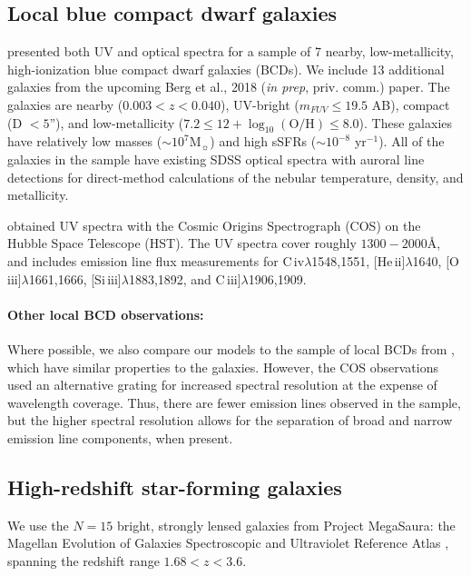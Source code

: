 \documentclass[preprint2]{aastex62}
\newcommand{\oiii}{[O\,{\sc iii}]\xspace}
\newcommand{\heii}{[He\,{\sc ii}]\xspace}
\newcommand{\civ}{C\,{\sc iv}\xspace}
\newcommand{\SiuIII}{[Si\,{\sc iii}]\xspace}
\newcommand{\ciii}{C\,{\sc iii}]\xspace}
\newcommand\Msun{\ensuremath{\mathrm{M_{\sun}}}\xspace}
\newcommand{\logten}{\ensuremath{\log_{10}}}
\newcommand{\logOH}{\ensuremath{\logten (\mathrm{O}/\mathrm{H})}\xspace}
\newcommand{\ang}{\ensuremath{\mbox{\AA}}\xspace}
\newcommand{\mage}{{\sc Meg}a{\sc S}a{\sc ura}\xspace}
\begin{document}
\subsection{Local blue compact dwarf galaxies}\label{sec:data:BCDs}

\citet{Berg+2016} presented both UV and optical spectra for a sample of 7 nearby, low-metallicity, high-ionization blue compact dwarf galaxies (BCDs). We include 13 additional galaxies from the upcoming Berg et al., 2018 (\emph{in prep}, priv. comm.) paper. The galaxies are nearby ($0.003 < z < 0.040$), UV-bright ($m_{FUV} \leq 19.5$ AB), compact (D $< 5$''), and low-metallicity ($7.2 \leq 12 + \logOH \leq 8.0$). These galaxies have relatively low masses (${\sim}10^7$\Msun) and high sSFRs (${\sim}10^{-8}$ yr$^{-1}$). All of the galaxies in the sample have existing SDSS optical spectra with auroral line detections for direct-method calculations of the nebular temperature, density, and metallicity.

\citet{Berg+2016} obtained UV spectra with the Cosmic Origins Spectrograph (COS) on the Hubble Space Telescope (HST). The UV spectra cover roughly $1300-2000$\ang, and \citet{Berg+2016} includes emission line flux measurements for \civ$\lambda$1548,1551, \heii$\lambda$1640, \oiii$\lambda$1661,1666, \SiuIII$\lambda$1883,1892, and \ciii$\lambda$1906,1909.

\paragraph{Other local BCD observations:} Where possible, we also compare our models to the sample of local BCDs from \citet{Senchyna+2017}, which have similar properties to the \citet{Berg+2016} galaxies. However, the COS observations used an alternative grating for increased spectral resolution at the expense of wavelength coverage. Thus, there are fewer emission lines observed in the \citet{Senchyna+2017} sample, but the higher spectral resolution allows for the separation of broad and narrow emission line components, when present.

\subsection{High-redshift star-forming galaxies}\label{sec:data:mage}

We use the $N = 15$ bright, strongly lensed galaxies from Project \mage: the Magellan Evolution of Galaxies Spectroscopic and Ultraviolet Reference Atlas \citep{Rigby+2018a, Rigby+2018b}, spanning the redshift range $1.68 < z < 3.6$.
\end{document}
